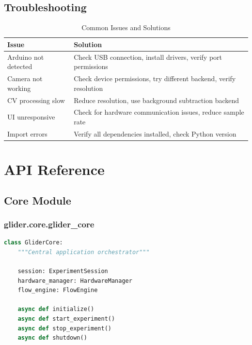 \documentclass[11pt,a4paper]{article}
\begin{document}
\subsection{Troubleshooting}

\begin{table}[H]
\centering
\begin{tabular}{@{}p{5cm}p{8cm}@{}}
\toprule
\textbf{Issue} & \textbf{Solution} \\
\midrule
Arduino not detected & Check USB connection, install drivers, verify port permissions \\
Camera not working & Check device permissions, try different backend, verify resolution \\
CV processing slow & Reduce resolution, use background subtraction backend \\
UI unresponsive & Check for hardware communication issues, reduce sample rate \\
Import errors & Verify all dependencies installed, check Python version \\
\bottomrule
\end{tabular}
\caption{Common Issues and Solutions}
\end{table}

\section{API Reference}

\subsection{Core Module}

\subsubsection{glider.core.glider\_core}

\begin{lstlisting}[language=Python]
class GliderCore:
    """Central application orchestrator"""

    session: ExperimentSession
    hardware_manager: HardwareManager
    flow_engine: FlowEngine

    async def initialize()
    async def start_experiment()
    async def stop_experiment()
    async def shutdown()
\end{lstlisting}
\end{document}
